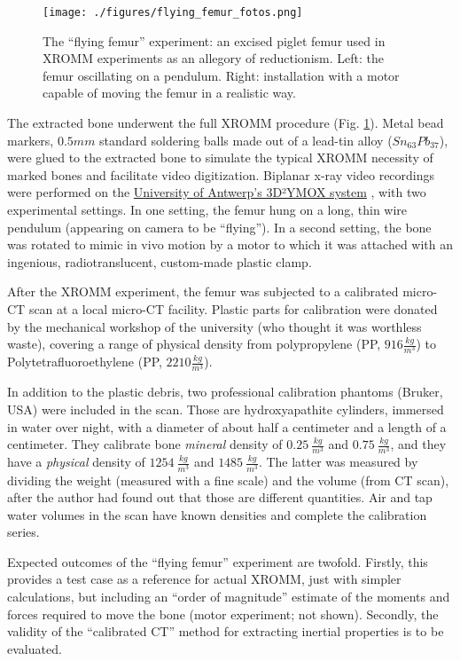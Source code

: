 \begin{figure}[htbp]
\centering
\texttt{[image: ./figures/flying\_femur\_fotos.png]}
\caption{\label{fig:flying_femur_fotos}The ``flying femur'' experiment: an excised piglet femur used in XROMM experiments as an allegory of reductionism. Left: the femur oscillating on a pendulum. Right: installation with a motor capable of moving the femur in a realistic way.}
\end{figure}


The extracted bone underwent the full XROMM procedure (Fig. \ref{fig:flying_femur_fotos}).
Metal bead markers, \(0.5 mm\) standard soldering balls made out of a lead-tin alloy (\(Sn_{63}Pb_{37}\)), were glued to the extracted bone to simulate the typical XROMM necessity of marked bones and facilitate video digitization.
Biplanar x-ray video recordings were performed on the \href{https://www.uantwerpen.be/3d2ymox}{University of Antwerp's 3D²YMOX system} \citep{Nguyen2021,Sanctorum2020}, with two experimental settings.
In one setting, the femur hung on a long, thin wire pendulum (appearing on camera to be ``flying'').
In a second setting, the bone was rotated to mimic in vivo motion by a motor to which it was attached with an ingenious, radiotranslucent, custom-made plastic clamp.

After the XROMM experiment, the femur was subjected to a calibrated micro-CT scan at a local micro-CT facility.
Plastic parts for calibration were donated by the mechanical workshop of the university (who thought it was worthless waste), covering a range of physical density from polypropylene (PP, \(916 \frac{kg}{m^3}\)) to Polytetrafluoroethylene (PP, \(2210 \frac{kg}{m^3}\)).

In addition to the plastic debris, two professional calibration phantoms (Bruker, USA) were included in the scan.
Those are hydroxyapathite cylinders, immersed in water over night, with a diameter of about half a centimeter and a length of a centimeter.
They calibrate bone \emph{mineral} density of \(0.25\ \frac{kg}{m^3}\) and \(0.75\ \frac{kg}{m^3}\), and they have a \emph{physical} density of \(1254\ \frac{kg}{m^3}\) and \(1485\ \frac{kg}{m^3}\).
The latter was measured by dividing the weight (measured with a fine scale) and the volume (from CT scan), after the author had found out that those are different quantities.
Air and tap water volumes in the scan have known densities and complete the calibration series.


Expected outcomes of the ``flying femur'' experiment are twofold.
Firstly, this provides a test case as a reference for actual XROMM, just with simpler calculations, but including an ``order of magnitude'' estimate of the moments and forces required to move the bone (motor experiment; not shown).
Secondly, the validity of the ``calibrated CT'' method for extracting inertial properties is to be evaluated.


